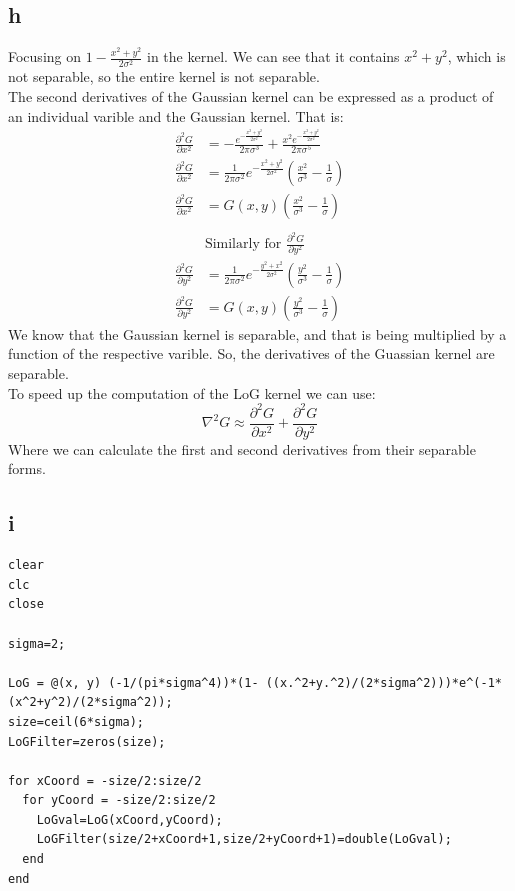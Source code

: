 \documentclass[11pt]{article}
\begin{document}
\subsection{h}
\label{sec:orgd9c1dc9}
Focusing on \(1-\frac{x^2+y^2}{2\sigma^2}\) in the kernel. We can see that it contains \(x^2+y^2\), which is not separable, so the entire kernel is not separable. \\
The second derivatives of the Gaussian kernel can be expressed as a product of an individual varible and the Gaussian kernel. That is:
\begin{align*}
\frac{\partial^2 G}{\partial x^2}&=-\frac{e^{-\frac{ x^{2} + y^2}{2 \sigma^{2}}}}{2 \pi \sigma^{3}} + \frac{x^{2} e^{-\frac{ x^{2} + y^2}{2 \sigma^{2}}}}{2 \pi \sigma^{5}} \\
\frac{\partial^2 G}{\partial x^2}&=\frac{1}{2\pi\sigma^2}e^{-\frac{x^2+y^2}{2\sigma^2}} \left( \frac{x^2}{\sigma^3}-\frac{1}{\sigma}\right) \\
\frac{\partial^2 G}{\partial x^2}&=G(x,y)\left( \frac{x^2}{\sigma^3}-\frac{1}{\sigma}\right) \\
& \\
& \textrm{Similarly for } \frac{\partial^2 G}{\partial y^2}\\
\frac{\partial^2 G}{\partial y^2}&=\frac{1}{2\pi\sigma^2}e^{-\frac{y^2+x^2}{2\sigma^2}} \left( \frac{y^2}{\sigma^3}-\frac{1}{\sigma}\right) \\
\frac{\partial^2 G}{\partial y^2}&=G(x,y)\left( \frac{y^2}{\sigma^3}-\frac{1}{\sigma}\right)
\end{align*}
We know that the Gaussian kernel is separable, and that is being multiplied by a function of the respective varible. So, the derivatives of the Guassian kernel are separable.\\
To speed up the computation of the LoG kernel we can use:
\[\nabla^2 G\approx \frac{\partial^2 G}{\partial x^2} + \frac{\partial^2 G}{\partial y^2}\]
Where we can calculate the first and second derivatives from their separable forms.
\subsection{i}
\label{sec:orgda19622}
\begin{verbatim}
clear
clc
close

sigma=2;

LoG = @(x, y) (-1/(pi*sigma^4))*(1- ((x.^2+y.^2)/(2*sigma^2)))*e^(-1*(x^2+y^2)/(2*sigma^2));
size=ceil(6*sigma);
LoGFilter=zeros(size);

for xCoord = -size/2:size/2
  for yCoord = -size/2:size/2
    LoGval=LoG(xCoord,yCoord);
    LoGFilter(size/2+xCoord+1,size/2+yCoord+1)=double(LoGval);
  end
end


\end{verbatim}
\end{document}
